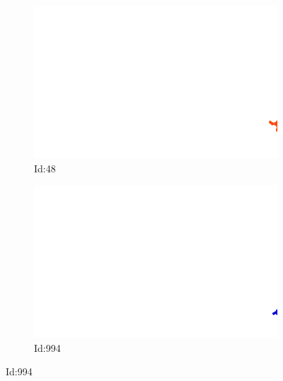 \documentclass[12pt,twoside]{report}
\begin{document}
\begin{figure}
\centering
\begin{subfigure}[b]{0.20\textwidth}
\centering
\includegraphics[width=\textwidth]{../../trajectories/48.png}
\caption{Id:48}
\end{subfigure}
\begin{subfigure}[b]{0.20\textwidth}
\centering
\includegraphics[width=\textwidth]{../../trajectories/994.png}
\caption{Id:994}
\end{subfigure}
\end{figure}
\end{document}
